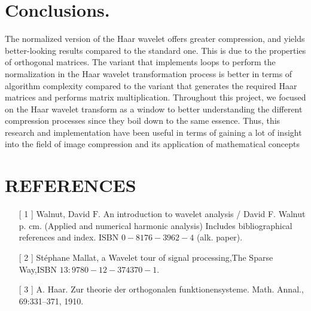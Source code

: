 \section{Conclusions.}

The normalized version of the Haar wavelet offers greater compression, and yields better-looking results compared to the standard one. This is due to the properties of orthogonal matrices. The variant that implements loops to perform the normalization in the Haar wavelet transformation process is better in terms of algorithm complexity compared to the variant that generates the required Haar matrices and performs matrix multiplication. Throughout this project, we focused on the Haar wavelet transform as a window to better understanding the different compression processes since they boil down to the same essence. Thus, this research and implementation have been useful in terms of gaining a lot of insight into the field of image compression and its application of mathematical concepts 

\section{REFERENCES}

\begin{enumerate}
    \item[[ 1]]   Walnut, David $\mathrm{F}$. An introduction to wavelet analysis / David F. Walnut p. cm. (Applied and numerical harmonic analysis) Includes bibliographical references and index. ISBN $0-8176-3962-4$ (alk. paper).
    \item[[ 2]]  Stéphane Mallat, a Wavelet tour of signal processing,The Sparse Way,ISBN $13: 9780-12-374370-1$.
    \item[[ 3]] A. Haar. Zur theorie der orthogonalen funktionensysteme. Math. Annal., 69:331–371, 1910.
\end{enumerate}






